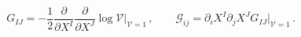 \begin{equation*}
G_{IJ} = -\frac 12 \frac{\partial }{\partial X^I}\frac{\partial }{\partial
X^J}\log \mathcal{V}\Big|_{\mathcal{V}=1}\,, \qquad \mathcal{G}_{ij}
= \partial_i X^I \partial_j X^J G_{IJ}\Big|_{\mathcal{V} = 1}\,.
\end{equation*}

